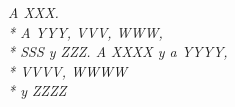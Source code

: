 \cleardoublepage
\thispagestyle{empty}
\null\vskip 1cm
\textit{\raggedleft
  A XXX. \\*
  A YYY, VVV, WWW, \\*
  SSS y ZZZ.
  \vskip 4cm
  A XXXX y a YYYY, \\*
  VVVV, WWWW \\*
  y ZZZZ \\
}
